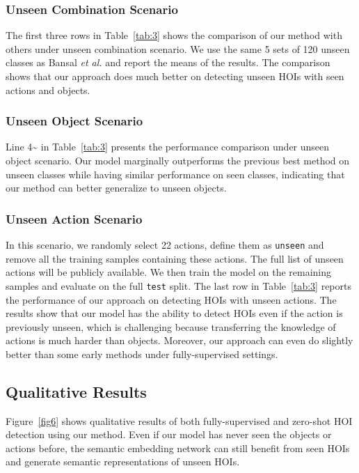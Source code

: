 \documentclass[sigconf,screen]{acmart}
\begin{document}
\subsubsection{Unseen Combination Scenario}

The first three rows in Table~\ref{tab:3} shows the comparison of our method with others under unseen combination scenario. We use the same 5 sets of 120 unseen classes as Bansal \textit{et al.} and report the means of the results. The comparison shows that our approach does much better on detecting unseen HOIs with seen actions and objects.

\subsubsection{Unseen Object Scenario}

Line 4\;\textasciitilde{} in Table~\ref{tab:3} presents the performance comparison under unseen object scenario. Our model marginally outperforms the previous best method on unseen classes while having similar performance on seen classes, indicating that our method can better generalize to unseen objects.

\subsubsection{Unseen Action Scenario}

In this scenario, we randomly select 22 actions, define them as \verb|unseen| and remove all the training samples containing these actions. The full list of unseen actions will be publicly available. We then train the model on the remaining samples and evaluate on the full \verb|test| split. The last row in Table~\ref{tab:3} reports the performance of our approach on detecting HOIs with unseen actions. The results show that our model has the ability to detect HOIs even if the action is previously unseen, which is challenging because transferring the knowledge of actions is much harder than objects. Moreover, our approach can even do slightly better than some early methods under fully-supervised settings.

\subsection{Qualitative Results}

Figure~\ref{fig6} shows qualitative results of both fully-supervised and zero-shot HOI detection using our method. Even if our model has never seen the objects or actions before, the semantic embedding network can still benefit from seen HOIs and generate semantic representations of unseen HOIs.
\end{document}
